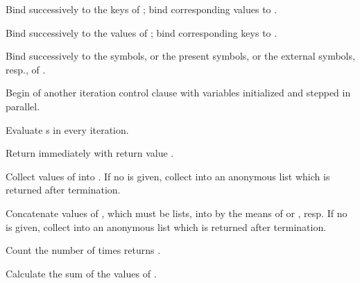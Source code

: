 \begin{LIST}{1cm}
\begin{LIST}{.5cm}
\begin{LIST}{.25cm}
\begin{LIST}{.5cm}
        Bind  successively to the keys of ; bind corresponding values to .

        Bind  successively to the values of ; bind corresponding keys to .

        Bind  successively to the symbols, or the present symbols, or the external symbols, resp., of .

      \end{LIST}
    \end{LIST}
    
    Begin of another iteration control clause with variables initialized and stepped in parallel.

    Evaluate s in every iteration.
    
    Return immediately with return value .
    
    Collect values of  into . If no  is given, collect into an anonymous list
    which is returned after termination.

    Concatenate values of , which must be lists, into  by the means of  
    or , resp.  If no  is given, collect into an anonymous list
    which is returned after termination.

    Count the number of times  returns \T.
    
    Calculate the sum of the values of .
    

\end{LIST}
\end{LIST}
